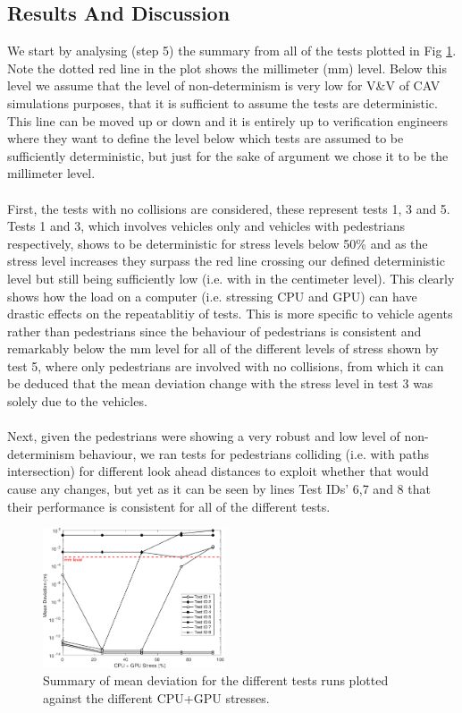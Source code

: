 \subsection{Results And Discussion}
\noindent We start by analysing (step 5) the summary from all of the tests plotted in Fig \ref{ExperimentsStressSummary}. 
Note the dotted red line in the plot shows the millimeter (mm) level. 
Below this level we assume that the level of non-determinism is very low for V\&V of CAV simulations purposes, that it is sufficient to assume the tests are deterministic. 
This line can be moved up or down and it is entirely up to verification engineers where they want to define the level below which tests are assumed to be sufficiently deterministic, but just for the sake of argument we chose it to be the millimeter level.\\\\
First, the tests with no collisions are considered, these represent tests 1, 3 and 5.
Tests 1 and 3, which involves vehicles only and vehicles with pedestrians respectively, shows to be deterministic for stress levels below 50\% and as the stress level increases they surpass the red line crossing our defined deterministic level but still being sufficiently low (i.e. with in the centimeter level). This clearly shows how the load on a computer (i.e. stressing CPU and GPU) can have drastic effects on the repeatablitiy of tests.
This is more specific to vehicle agents rather than pedestrians since the behaviour of pedestrians is consistent and remarkably below the mm level for all of the different levels of stress shown by test 5, where only pedestrians are involved with no collisions, from which it can be deduced that the mean deviation change with the stress level in test 3 was solely due to the vehicles. \\\\
Next, given the pedestrians were showing a very robust and low level of non-determinism behaviour, we ran tests for pedestrians colliding (i.e. with paths intersection) for different look ahead distances to exploit whether that would cause any changes, but yet as it can be seen by lines Test IDs' 6,7 and 8 that their performance is consistent for all of the different tests.

\begin{figure}[h]
    \centering
    \includegraphics[width=0.48\textwidth]{Other/Figures/ExperimentsStressSummary.pdf}
    \caption{Summary of mean deviation for the different tests runs plotted against the different CPU+GPU stresses.}

    \label{ExperimentsStressSummary}
\end{figure}

